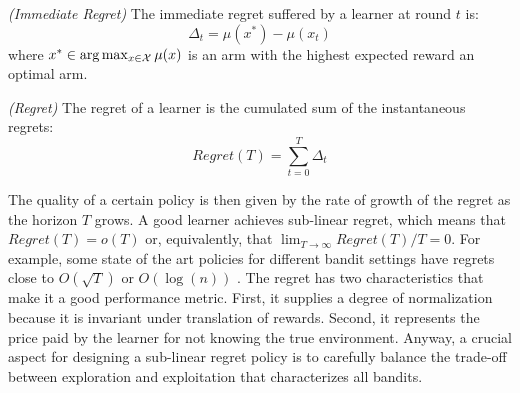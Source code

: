 \begin{definition}\label{def:immediateregret} \emph{(Immediate Regret)}
The immediate regret suffered by a learner at round $t$ is:
\begin{equation} 
\Delta_t = \mu(x^*) - \mu(x_t)
\end{equation}
where $x^* \in \arg\max_{x\in\mathcal{X}}\mu(x)$ is an arm with the highest expected reward \ie an optimal arm.
\end{definition}
\begin{definition}\label{def:regret} \emph{(Regret)}
The regret of a learner is the cumulated sum of the instantaneous regrets:
\begin{equation}
Regret(T) = \sum_{t=0}^T\Delta_t
\end{equation}
\end{definition}

The quality of a certain policy is then given by the rate of growth of the regret as the horizon $T$ grows. A good learner achieves sub-linear regret, which means that $Regret(T) = o(T)$ or, equivalently, that $\lim_{T\to\infty}Regret(T)/T = 0$. For example, some state of the art policies for different bandit settings have regrets close to $O(\sqrt{T})$ or $O(\log(n))$ \cite{lattimore2019bandit}. The regret has two characteristics that make it a good performance metric. First, it supplies a degree of normalization because it is invariant under translation of rewards. Second, it represents the price paid by the learner for not knowing the true environment. Anyway, a crucial aspect for designing a sub-linear regret policy is to carefully balance the trade-off between exploration and exploitation that characterizes all bandits.

